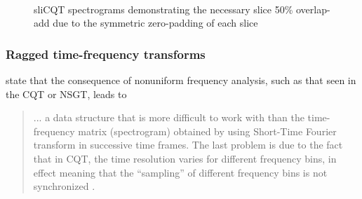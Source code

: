 \documentclass[report.tex]{subfiles}
\begin{document}
\begin{figure}[ht]
	\centering
	\\
	\caption{sliCQT spectrograms demonstrating the necessary slice 50\% overlap-add due to the symmetric zero-padding of each slice}
	\label{fig:slicqoverlaps}
\end{figure}

\subsubsection{Ragged time-frequency transforms}
\label{sec:raggedtf}

\citeauthor{klapuricqt} state that the consequence of nonuniform frequency analysis, such as that seen in the CQT or NSGT, leads to
\begin{quote}
	... a data structure that is more difficult to work with than the time-frequency matrix (spectrogram) obtained by using Short-Time Fourier transform in successive time frames. The last problem is due to the fact that in CQT, the time resolution varies for different frequency bins, in effect meaning that the ``sampling'' of different frequency bins is not synchronized \parencite[1]{klapuricqt}.
\end{quote}
\end{document}

